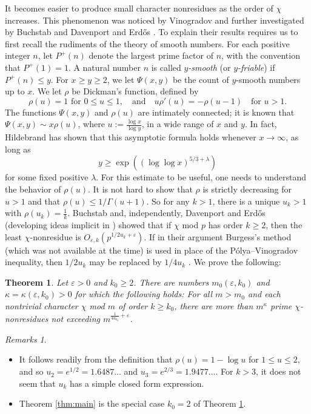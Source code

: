 \documentclass{scrartcl}
\theoremstyle{plain}
\newtheorem{thm}{Theorem}[section]
\theoremstyle{remark}
\newtheorem*{rmk}{Remarks}
\newcommand{\1}{\mathbf{1}}
\begin{document}
It becomes easier to produce small character nonresidues as the order of $\chi$ increases. This phenomenon was noticed by Vinogradov \cite{vinogradov27} and further investigated by Buchstab \cite{buchstab49} and Davenport and Erd\H{o}s \cite{DE52}. To explain their results requires us to first recall the rudiments of the theory of smooth numbers. For each positive integer $n$, let $P^{+}(n)$ denote the largest prime factor of $n$, with the convention that $P^{+}(1)=1$. A natural number $n$ is called \emph{$y$-smooth} (or \emph{$y$-friable}) if $P^{+}(n) \le y$. For $x \ge y \ge 2$, we let $\Psi(x,y)$ be the count of $y$-smooth numbers up to $x$. We let $\rho$ be Dickman's function, defined by
\[ \rho(u)=1\text{ for $0 \le u \le 1$}, \quad \text{and}\quad u \rho'(u) = -\rho(u-1) \quad\text{for $u > 1$}. \]
The functions $\Psi(x,y)$ and $\rho(u)$ are intimately connected; it is known that $\Psi(x,y) \sim x\rho(u)$, where $u:=\frac{\log{x}}{\log{y}}$, in a wide range of $x$ and $y$. In fact, Hildebrand \cite{hildebrand86} has shown that this asymptotic formula holds whenever $x\to\infty$, as long as
\[ y \ge \exp((\log\log{x})^{5/3+\lambda}) \]
for some fixed positive $\lambda$. For this estimate to be useful, one needs to understand the behavior of $\rho(u)$. It is not hard to show that $\rho$ is strictly decreasing for $u > 1$ and that $\rho(u) \le 1/\Gamma(u+1)$. So for any $k > 1$, there is a unique $u_k > 1$ with $\rho(u_k)=\frac{1}{k}$. Buchstab and, independently, Davenport and Erd\H{o}s (developing ideas implicit in \cite{vinogradov27}) showed that if $\chi$ mod $p$ has order $k \ge 2$, then the least $\chi$-nonresidue is $O_{\varepsilon,k}(p^{1/2u_k+\varepsilon})$. If in their argument Burgess's method (which was not available at the time) is used in place of the P\'olya--Vinogradov inequality, then $1/2u_k$ may be replaced by $1/4u_k$ \cite{wy64}. We prove the following:

\begin{thm}\label{thm:fixedprime} Let $\varepsilon >0$ and $k_0 \ge 2$. There are numbers $m_0(\varepsilon,k_0)$ and $\kappa = \kappa(\varepsilon,k_0) > 0$ for which the following holds: For all $m > m_0$ and each nontrivial character $\chi$ mod $m$ of order $k \ge k_0$, there are more than $m^{\kappa}$ prime $\chi$-nonresidues not exceeding $m^{\frac{1}{4u_{k_0}}+\varepsilon}$.\end{thm}
\begin{rmk}\mbox{ }
\begin{itemize}
\item It follows readily from the definition that $\rho(u) = 1-\log{u}$ for $1 \le u \le 2$,  and so $u_2 =  e^{1/2} = 1.6487\ldots$ and $u_3 = e^{2/3} = 1.9477\ldots$. For $k > 3$, it does not seem that $u_k$ has a simple closed form expression.
\item Theorem \ref{thm:main} is the special case $k_0=2$ of Theorem \ref{thm:fixedprime}.
\end{itemize}
\end{rmk}
\end{document}
